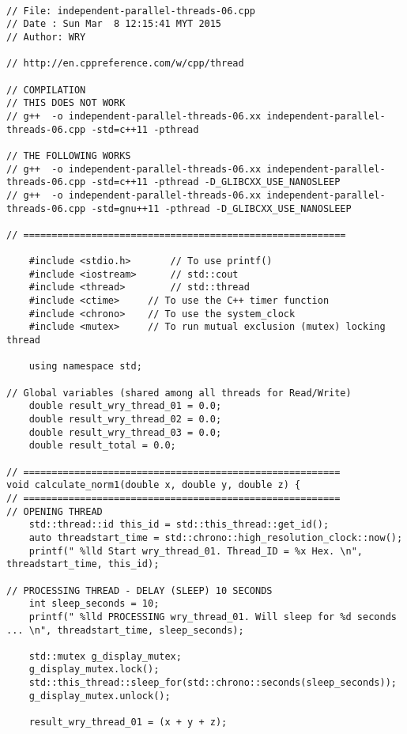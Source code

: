 \begin{lstlisting}[caption={App4-C++2011 Example Parallel Multithreading}, label=App4-C++2011 Example Parallel Multithreading]

// File: independent-parallel-threads-06.cpp
// Date : Sun Mar  8 12:15:41 MYT 2015 
// Author: WRY

// http://en.cppreference.com/w/cpp/thread

// COMPILATION
// THIS DOES NOT WORK
// g++  -o independent-parallel-threads-06.xx independent-parallel-threads-06.cpp -std=c++11 -pthread 

// THE FOLLOWING WORKS
// g++  -o independent-parallel-threads-06.xx independent-parallel-threads-06.cpp -std=c++11 -pthread -D_GLIBCXX_USE_NANOSLEEP 
// g++  -o independent-parallel-threads-06.xx independent-parallel-threads-06.cpp -std=gnu++11 -pthread -D_GLIBCXX_USE_NANOSLEEP 

// =========================================================

	#include <stdio.h>       // To use printf()
	#include <iostream>      // std::cout
	#include <thread>        // std::thread
	#include <ctime>	 // To use the C++ timer function
	#include <chrono>	 // To use the system_clock
	#include <mutex>	 // To run mutual exclusion (mutex) locking thread
	
	using namespace std;

// Global variables (shared among all threads for Read/Write)
	double result_wry_thread_01 = 0.0;
	double result_wry_thread_02 = 0.0;
	double result_wry_thread_03 = 0.0;
	double result_total = 0.0;

// ======================================================== 
void calculate_norm1(double x, double y, double z) {
// ========================================================
// OPENING THREAD
	std::thread::id this_id = std::this_thread::get_id();
	auto threadstart_time = std::chrono::high_resolution_clock::now();
	printf(" %lld Start wry_thread_01. Thread_ID = %x Hex. \n", threadstart_time, this_id);

// PROCESSING THREAD - DELAY (SLEEP) 10 SECONDS
	int sleep_seconds = 10;
	printf(" %lld PROCESSING wry_thread_01. Will sleep for %d seconds ... \n", threadstart_time, sleep_seconds);
	
	std::mutex g_display_mutex;
	g_display_mutex.lock();
	std::this_thread::sleep_for(std::chrono::seconds(sleep_seconds));
	g_display_mutex.unlock();
	
	result_wry_thread_01 = (x + y + z);


\end{lstlisting}
